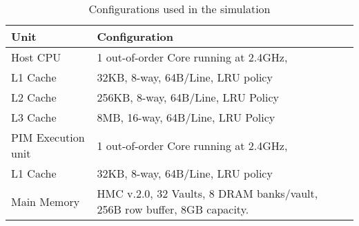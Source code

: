 %    
%
%
%
%
%
%
\begin{table}[t!]
\small
\caption{Configurations used in the simulation }
    \begin{tabularx}{\columnwidth}{lXr}
\toprule
Unit & Configuration  \\
\midrule
Host CPU & 1 out-of-order Core running at 2.4GHz,   \\
L1 Cache & 32KB, 8-way, 64B/Line, LRU policy \\
L2 Cache & 256KB, 8-way, 64B/Line, LRU Policy \\
L3 Cache & 8MB, 16-way, 64B/Line, LRU Policy  \\
\midrule
PIM Execution unit & 1 out-of-order Core running at 2.4GHz,   \\
L1 Cache & 32KB, 8-way, 64B/Line, LRU policy \\
\midrule
Main Memory & HMC v.2.0, 32 Vaults, 8 DRAM banks/vault, 256B row buffer, 8GB capacity.\\


\bottomrule
  \end{tabularx}
\label{table:hostarch}
\end{table}
